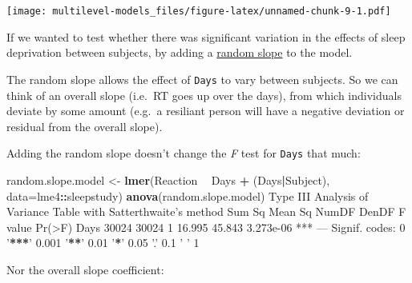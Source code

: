 \documentclass[]{article}
\newenvironment{Shaded}{\begin{snugshade}}{\end{snugshade}}
\newcommand{\DataTypeTok}[1]{\textcolor[rgb]{0.13,0.29,0.53}{#1}}
\newcommand{\ErrorTok}[1]{\textcolor[rgb]{0.64,0.00,0.00}{\textbf{#1}}}
\newcommand{\FloatTok}[1]{\textcolor[rgb]{0.00,0.00,0.81}{#1}}
\newcommand{\KeywordTok}[1]{\textcolor[rgb]{0.13,0.29,0.53}{\textbf{#1}}}
\newcommand{\NormalTok}[1]{#1}
\newcommand{\OperatorTok}[1]{\textcolor[rgb]{0.81,0.36,0.00}{\textbf{#1}}}
\newcommand{\StringTok}[1]{\textcolor[rgb]{0.31,0.60,0.02}{#1}}
\begin{document}
\texttt{[image: multilevel-models\_files/figure-latex/unnamed-chunk-9-1.pdf]}

If we wanted to test whether there was significant variation in the effects of
sleep deprivation between subjects, by adding a
\protect\hyperlink{random-slopes-intercepts}{random slope} to the model.

The random slope allows the effect of \texttt{Days} to vary between subjects. So we can
think of an overall slope (i.e.~RT goes up over the days), from which
individuals deviate by some amount (e.g.~a resiliant person will have a negative
deviation or residual from the overall slope).

Adding the random slope doesn't change the \emph{F} test for \texttt{Days} that much:

\begin{Shaded}
\begin{Highlighting}[]
\NormalTok{random.slope.model <-}\StringTok{ }\KeywordTok{lmer}\NormalTok{(Reaction }\OperatorTok{~}\StringTok{ }\NormalTok{Days }\OperatorTok{+}\StringTok{ }\NormalTok{(Days}\OperatorTok{|}\NormalTok{Subject),  }\DataTypeTok{data=}\NormalTok{lme4}\OperatorTok{::}\NormalTok{sleepstudy)}
\KeywordTok{anova}\NormalTok{(random.slope.model)}
\NormalTok{Type III Analysis of Variance Table with Satterthwaite}\StringTok{'s method}
\StringTok{     Sum Sq Mean Sq NumDF  DenDF F value    Pr(>F)    }
\StringTok{Days  30024   30024     1 16.995  45.843 3.273e-06 ***}
\StringTok{---}
\StringTok{Signif. codes:  0 '}\OperatorTok{**}\ErrorTok{*}\StringTok{' 0.001 '}\OperatorTok{**}\StringTok{' 0.01 '}\OperatorTok{*}\StringTok{' 0.05 '}\NormalTok{.}\StringTok{' 0.1 '} \StringTok{' 1}
\end{Highlighting}
\end{Shaded}

Nor the overall slope coefficient:

\begin{Shaded}
\end{Shaded}
\end{document}
